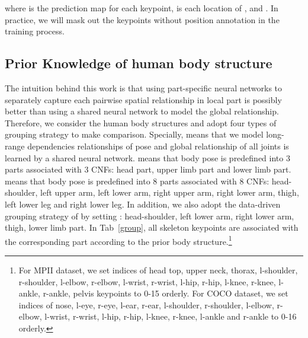 \documentclass[journal]{IEEEtran}
\begin{document}
where  is the prediction map for each keypoint,  is each location of ,  and . In practice, we will mask out the keypoints without position annotation in the training process.

\subsection{Prior Knowledge of human body structure}
\label{prior}
The intuition behind this work is that using part-specific neural networks to separately capture each pairwise spatial relationship in local part is possibly better than using a shared neural network to model the global relationship. Therefore, we consider the human body structures and adopt four types of grouping strategy to make comparison. Specially,  means that we model long-range dependencies relationships of pose and global relationship of all joints is learned  by a shared neural network.  means that body pose is predefined into 3 parts associated with 3 CNFs: head part, upper limb part and lower limb part.  means that body pose is predefined into 8 parts associated with 8 CNFs: head-shoulder, left upper arm, left lower arm, right upper arm, right lower arm, thigh, left lower leg and right lower leg. In addition, we also adopt the data-driven grouping strategy of \cite{Tang_2019_CVPR} by setting : head-shoulder, left lower arm, right lower arm, thigh, lower limb part. In Tab~\ref{group}, all skeleton keypoints are associated with the corresponding part according to the prior body structure.\footnote{For MPII \cite{andriluka20142d} dataset, we set indices of head top, upper neck, thorax, l-shoulder, r-shoulder, l-elbow, r-elbow, l-wrist, r-wrist, l-hip, r-hip, l-knee, r-knee, l-ankle, r-ankle, pelvis keypoints to 0-15 orderly. For COCO \cite{lin2014microsoft} dataset, we set indices of nose, l-eye, r-eye, l-ear, r-ear, l-shoulder, r-shoulder, l-elbow, r-elbow, l-wrist, r-wrist, l-hip, r-hip, l-knee, r-knee, l-ankle and r-ankle to 0-16 orderly. }
\end{document}
